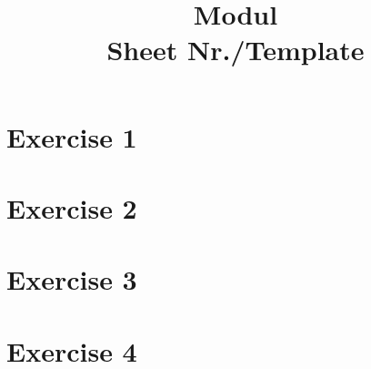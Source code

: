 \documentclass[bibliography=totocnumbered]{scrartcl}
\title{Modul\\Sheet Nr./Template}
\begin{document}
    \maketitle
    \tableofcontents
    \listoffigures
    
    \newpage
    \section{Exercise 1}

    \newpage
    \section{Exercise 2}

    \newpage
    \section{Exercise 3}

    \newpage
    \section{Exercise 4}

    \newpage
    \appendix
    \printbibliography[title={Sources}]
\end{document}
